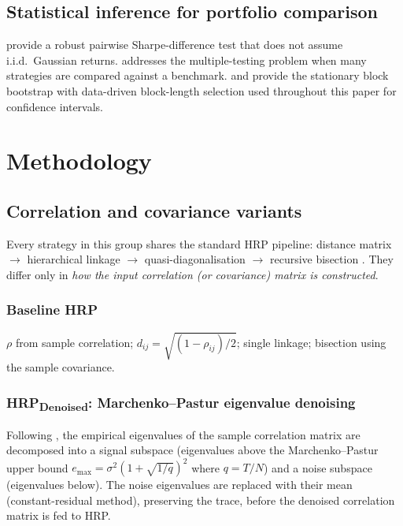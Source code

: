 \documentclass[11pt,a4paper]{article}
\begin{document}
\subsection{Statistical inference for portfolio comparison}
\citet{ledoitwolf2008sharpe} provide a robust pairwise Sharpe-difference
test that does not assume i.i.d.\ Gaussian returns.
\citet{hansen2005spa} addresses the multiple-testing problem when many
strategies are compared against a benchmark. \citet{politis1994bootstrap}
and \citet{politis2004blocklength} provide the stationary block
bootstrap with data-driven block-length selection used throughout
this paper for confidence intervals.

\section{Methodology}
\label{sec:methods}

\subsection{Correlation and covariance variants}
\label{sec:methods-cov}

Every strategy in this group shares the standard HRP pipeline: distance
matrix $\to$ hierarchical linkage $\to$ quasi-diagonalisation $\to$
recursive bisection \citep{lopezdeprado2016hrp}. They differ only in
\emph{how the input correlation (or covariance) matrix is constructed}.

\subsubsection{Baseline HRP}
$\rho$ from sample correlation; $d_{ij} = \sqrt{(1-\rho_{ij})/2}$;
single linkage; bisection using the sample covariance.

\subsubsection{HRP\textsubscript{Denoised}: Marchenko--Pastur eigenvalue denoising}
Following \citet{lopezdeprado2020mlam}, the empirical eigenvalues of
the sample correlation matrix are decomposed into a signal subspace
(eigenvalues above the Marchenko--Pastur upper bound $e_{\max} =
\sigma^2 (1+\sqrt{1/q})^2$ where $q=T/N$) and a noise subspace
(eigenvalues below). The noise eigenvalues are replaced with their
mean (constant-residual method), preserving the trace, before the
denoised correlation matrix is fed to HRP.
\end{document}
